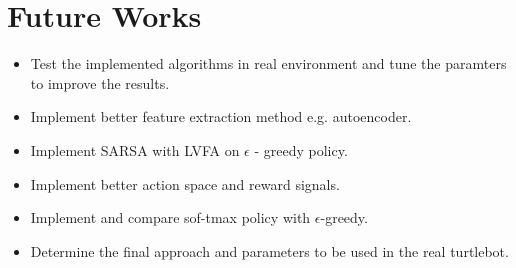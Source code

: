 \documentclass{article}
\begin{document}
\section{Future Works}
\begin{itemize}
\item Test the implemented algorithms in real environment and tune the paramters to improve the results.
\item Implement better feature extraction method e.g. autoencoder.
\item Implement SARSA with LVFA on $\epsilon$ - greedy policy. 
\item Implement better action space and reward signals.
\item Implement and compare sof-tmax policy with $\epsilon$-greedy.
\item Determine the final approach and parameters to be used in the real turtlebot.
\end{itemize}
\medskip
% 
% 
\end{document}
